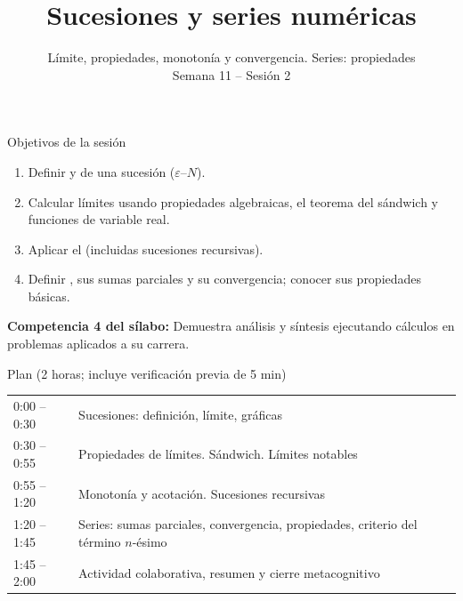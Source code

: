 \documentclass[10pt,aspectratio=169]{beamer}
\title[Sucesiones y series]{Sucesiones y series numéricas}
\subtitle{Límite, propiedades, monotonía y convergencia. Series: propiedades\\[2pt]\small Semana 11 -- Sesión 2}
\begin{document}
\begin{frame}
  \titlepage
\end{frame}

\begin{frame}{Objetivos de la sesión}
  \begin{enumerate}
    \item Definir  y  de una sucesión ($\varepsilon$--$N$).
    \item Calcular límites usando propiedades algebraicas, el teorema del sándwich y funciones de variable real.
    \item Aplicar el  (incluidas sucesiones recursivas).
    \item Definir , sus sumas parciales y su convergencia; conocer sus propiedades básicas.
  \end{enumerate}
  \vspace{1mm}
  {\small\textbf{Competencia 4 del sílabo:} Demuestra análisis y síntesis ejecutando cálculos en problemas aplicados a su carrera.}
  \begin{block}{Plan (2 horas; incluye verificación previa de 5 min)}
    \begin{tabular}{ll}
      0:00 -- 0:30 & Sucesiones: definición, límite, gráficas\\
      0:30 -- 0:55 & Propiedades de límites. Sándwich. Límites notables\\
      0:55 -- 1:20 & Monotonía y acotación. Sucesiones recursivas\\
      1:20 -- 1:45 & Series: sumas parciales, convergencia, propiedades, criterio del término $n$-ésimo\\
      1:45 -- 2:00 & Actividad colaborativa, resumen y cierre metacognitivo
    \end{tabular}
  \end{block}
\end{frame}
\end{document}
